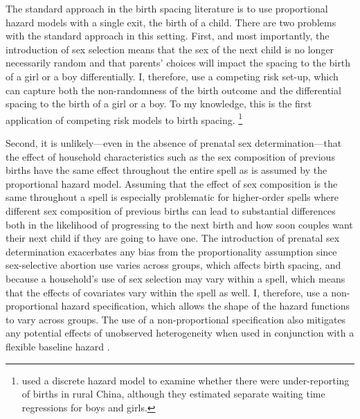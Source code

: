 \documentclass[12pt,letterpaper]{article}
\begin{document}
The standard approach in the birth spacing literature is to use proportional hazard
models with a single exit, the birth of a child.
There are two problems with the standard approach in this setting.
First, and most importantly, the introduction of sex selection means that the sex of the 
next child is no longer necessarily random and that parents' choices will impact the 
spacing to the birth of a girl or a boy differentially.
I, therefore, use a competing risk set-up, which can capture both the non-randomness of
the birth outcome and the differential spacing to the birth of a girl or a boy.
To my knowledge, this is the first application of competing risk models to birth
spacing.%
\footnote{
\cite{Merli2000} used a discrete hazard model to examine whether 
there were under-reporting of births in rural China, although they 
estimated separate waiting time regressions for boys and girls.
}

Second, it is unlikely---even in the absence of prenatal sex determination---that the 
effect of household characteristics such as the sex composition of previous births have 
the same effect throughout the entire spell as is assumed by the proportional hazard
model.
Assuming that the effect of sex composition is the same throughout a spell is especially 
problematic for higher-order spells where different sex composition of previous births can 
lead to substantial differences both in the likelihood of progressing to the next birth 
and how soon couples want their next child if they are going to have one.
The introduction of prenatal sex determination exacerbates any bias from the 
proportionality assumption since sex-selective abortion use varies across groups,
which affects birth spacing, and because a household's use of sex selection may vary 
within a spell, which means that the effects of covariates vary within the spell as well.
I, therefore, use a non-proportional hazard specification, which allows the shape of the 
hazard functions to vary across groups.
The use of a non-proportional specification also mitigates any potential effects 
of unobserved heterogeneity when used in conjunction with a flexible baseline hazard 
\citep{Dolton1995}.
\end{document}
